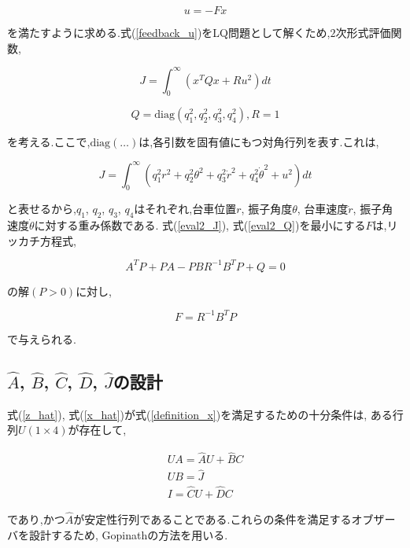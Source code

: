 \begin{equation}
    u = -Fx
    \label{feedback_u}
\end{equation}

を満たすように求める.式(\ref{feedback_u})をLQ問題として解くため,$2$次形式評価関数,

\begin{equation}
    J = \int_{0}^{\infty}
    \left(
        x^{T}Qx + Ru^2
    \right)
    dt
    \label{eval2_J}
\end{equation}

\begin{equation}
    Q = \mbox{diag}(q_{1}^2, q_{2}^2, q_{3}^2, q_{4}^2), R = 1
    \label{eval2_Q}
\end{equation}

を考える.ここで,$\mbox{diag}(\dots)$は,各引数を固有値にもつ対角行列を表す.これは,

\begin{equation}
    J = \int_{0}^{\infty}
    \left(
        q_{1}^2 r^2 + q_{2}^2 \theta^2 + q_{3}^2 \dot{r}^2 + q_{4}^2 \dot{\theta}^2 + u^2
    \right)
    dt
\end{equation}

と表せるから,$q_{1}$, $q_{2}$, $q_{3}$, $q_{4}$はそれぞれ,台車位置$r$, 振子角度$\theta$,
台車速度$\dot{r}$, 振子角速度$\dot{\theta}$に対する重み係数である.
式(\ref{eval2_J}), 式(\ref{eval2_Q})を最小にする$F$は,リッカチ方程式,

$$
    A^{T}P + PA - PBR^{-1}B^{T}P + Q = 0
$$

の解$(P > 0)$に対し,

$$
    F = R^{-1}B^{T}P
$$

で与えられる.

\subsection{$\hat{A}$, $\hat{B}$, $\hat{C}$, $\hat{D}$, $\hat{J}$の設計}
式(\ref{z_hat}), 式(\ref{x_hat})が式(\ref{definition_x})を満足するための十分条件は,
ある行列$U(1 \times 4)$が存在して,

$$
    \begin{array}{c}
        UA = \hat{A}U + \hat{B}C \\
        UB = \hat{J} \\
        I = \hat{C}U + \hat{D}C
    \end{array}
$$

であり,かつ$\hat{A}$が安定性行列であることである.これらの条件を満足するオブザーバを設計するため,
Gopinathの方法を用いる.

